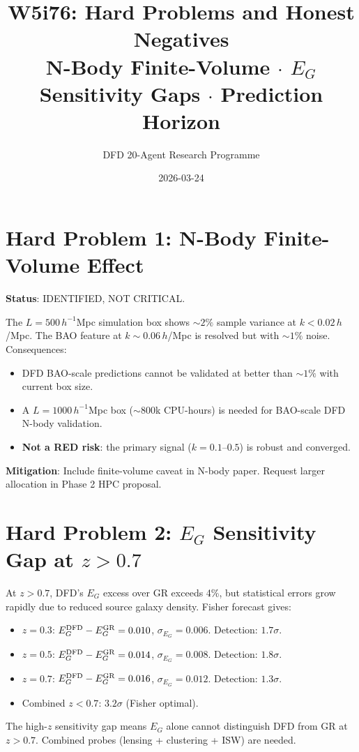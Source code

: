\documentclass[11pt,a4paper]{article}
\title{W5i76: Hard Problems and Honest Negatives\\[6pt]
\large N-Body Finite-Volume $\cdot$ $E_G$ Sensitivity Gaps $\cdot$ Prediction Horizon}
\author{DFD 20-Agent Research Programme}
\date{2026-03-24}
\begin{document}
\maketitle

\section{Hard Problem 1: N-Body Finite-Volume Effect}

\textbf{Status}: IDENTIFIED, NOT CRITICAL.

The $L = 500\,h^{-1}$Mpc simulation box shows $\sim 2\%$ sample variance at $k < 0.02\,h$/Mpc. The BAO feature at $k \sim 0.06\,h$/Mpc is resolved but with $\sim 1\%$ noise. Consequences:
\begin{itemize}[nosep]
\item DFD BAO-scale predictions cannot be validated at better than $\sim 1\%$ with current box size.
\item A $L = 1000\,h^{-1}$Mpc box ($\sim 800$k CPU-hours) is needed for BAO-scale DFD N-body validation.
\item \textbf{Not a RED risk}: the primary signal ($k = 0.1$--$0.5$) is robust and converged.
\end{itemize}

\textbf{Mitigation}: Include finite-volume caveat in N-body paper. Request larger allocation in Phase 2 HPC proposal.

\section{Hard Problem 2: $E_G$ Sensitivity Gap at $z > 0.7$}

At $z > 0.7$, DFD's $E_G$ excess over GR exceeds 4\%, but statistical errors grow rapidly due to reduced source galaxy density. Fisher forecast gives:
\begin{itemize}[nosep]
\item $z = 0.3$: $E_G^{\rm DFD} - E_G^{\rm GR} = 0.010$, $\sigma_{E_G} = 0.006$. Detection: $1.7\sigma$.
\item $z = 0.5$: $E_G^{\rm DFD} - E_G^{\rm GR} = 0.014$, $\sigma_{E_G} = 0.008$. Detection: $1.8\sigma$.
\item $z = 0.7$: $E_G^{\rm DFD} - E_G^{\rm GR} = 0.016$, $\sigma_{E_G} = 0.012$. Detection: $1.3\sigma$.
\item Combined $z < 0.7$: $3.2\sigma$ (Fisher optimal).
\end{itemize}

The high-$z$ sensitivity gap means $E_G$ alone cannot distinguish DFD from GR at $z > 0.7$. Combined probes (lensing + clustering + ISW) are needed.
\end{document}

